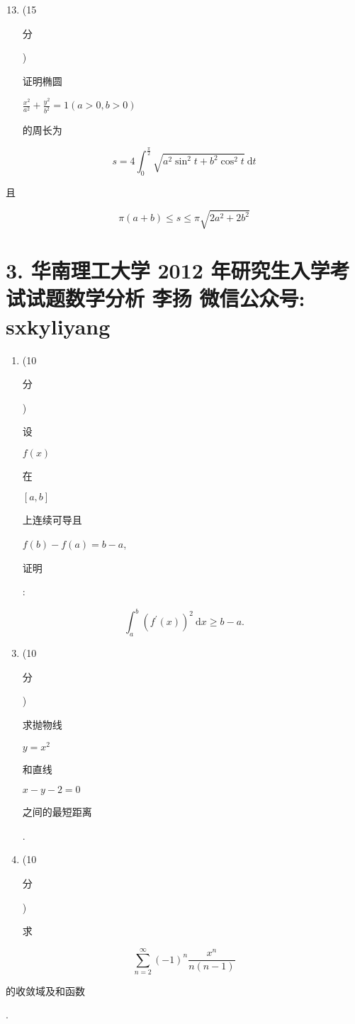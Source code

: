 \documentclass[10pt]{article}
\begin{document}
\begin{enumerate}
  \setcounter{enumi}{12}
  \item (15 \begin{CJK}{UTF8}{mj}分\end{CJK}) \begin{CJK}{UTF8}{mj}证明椭圆\end{CJK} $\frac{x^{2}}{a^{2}}+\frac{y^{2}}{b^{2}}=1(a>0, b>0)$ \begin{CJK}{UTF8}{mj}的周长为\end{CJK}
\end{enumerate}
$$
s=4 \int_{0}^{\frac{\pi}{2}} \sqrt{a^{2} \sin ^{2} t+b^{2} \cos ^{2} t} \mathrm{~d} t
$$
\begin{CJK}{UTF8}{mj}且\end{CJK}
$$
\pi(a+b) \leq s \leq \pi \sqrt{2 a^{2}+2 b^{2}}
$$

\section{3. 华南理工大学 2012 年研究生入学考试试题数学分析 
 李扬 
 微信公众号: sxkyliyang}
\begin{enumerate}
  \item (10 \begin{CJK}{UTF8}{mj}分\end{CJK}) \begin{CJK}{UTF8}{mj}设\end{CJK} $f(x)$ \begin{CJK}{UTF8}{mj}在\end{CJK} $[a, b]$ \begin{CJK}{UTF8}{mj}上连续可导且\end{CJK} $f(b)-f(a)=b-a$, \begin{CJK}{UTF8}{mj}证明\end{CJK}:
\end{enumerate}
$$
\int_{a}^{b}\left(f^{\prime}(x)\right)^{2} \mathrm{~d} x \geq b-a .
$$

\begin{enumerate}
  \setcounter{enumi}{2}
  \item (10 \begin{CJK}{UTF8}{mj}分\end{CJK}) \begin{CJK}{UTF8}{mj}求抛物线\end{CJK} $y=x^{2}$ \begin{CJK}{UTF8}{mj}和直线\end{CJK} $x-y-2=0$ \begin{CJK}{UTF8}{mj}之间的最短距离\end{CJK}.

  \item (10 \begin{CJK}{UTF8}{mj}分\end{CJK}) \begin{CJK}{UTF8}{mj}求\end{CJK}

\end{enumerate}
$$
\sum_{n=2}^{\infty}(-1)^{n} \frac{x^{n}}{n(n-1)}
$$
\begin{CJK}{UTF8}{mj}的收敛域及和函数\end{CJK}.
\end{document}
